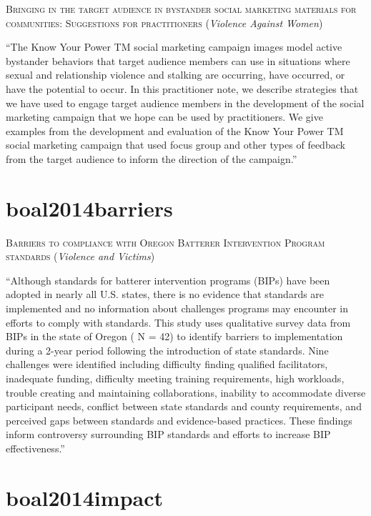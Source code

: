 \documentclass[]{tufte-handout}
\begin{document}
\textsc{\large{Bringing in the target audience in bystander social marketing materials for communities: Suggestions for practitioners}}
(\emph{Violence Against Women})

``The Know Your Power TM social marketing campaign images model active
bystander behaviors that target audience members can use in situations
where sexual and relationship violence and stalking are occurring, have
occurred, or have the potential to occur. In this practitioner note, we
describe strategies that we have used to engage target audience members
in the development of the social marketing campaign that we hope can be
used by practitioners. We give examples from the development and
evaluation of the Know Your Power TM social marketing campaign that used
focus group and other types of feedback from the target audience to
inform the direction of the campaign.''

\section{\texorpdfstring{\textcolor[HTML]{5b0057}{boal2014barriers}}{}}\label{section-18}

\textsc{\large{Barriers to compliance with Oregon Batterer Intervention Program standards}}
(\emph{Violence and Victims})

``Although standards for batterer intervention programs (BIPs) have been
adopted in nearly all U.S. states, there is no evidence that standards
are implemented and no information about challenges programs may
encounter in efforts to comply with standards. This study uses
qualitative survey data from BIPs in the state of Oregon ( N = 42) to
identify barriers to implementation during a 2-year period following the
introduction of state standards. Nine challenges were identified
including difficulty finding qualified facilitators, inadequate funding,
difficulty meeting training requirements, high workloads, trouble
creating and maintaining collaborations, inability to accommodate
diverse participant needs, conflict between state standards and county
requirements, and perceived gaps between standards and evidence-based
practices. These findings inform controversy surrounding BIP standards
and efforts to increase BIP effectiveness.''

\section{\texorpdfstring{\textcolor[HTML]{5b0057}{boal2014impact}}{}}\label{section-19}
\end{document}
